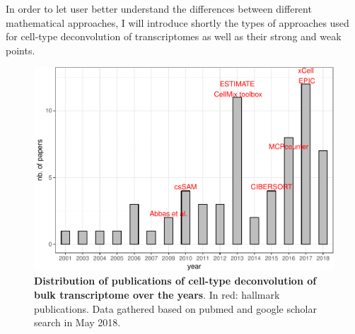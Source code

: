 \documentclass[12pt,]{book}
\theoremstyle{definition}
\theoremstyle{definition}
\theoremstyle{definition}
\theoremstyle{remark}
\begin{document}
In order to let user better understand the differences between different
mathematical approaches, I will introduce shortly the types of
approaches used for cell-type deconvolution of transcriptomes as well as
their strong and weak points.

\begin{figure}

{\centering \includegraphics[width=0.7\linewidth]{UCzPhDThesis_files/figure-latex/pubyear-1} 

}

\caption[Distribution of publications of cell-type deconvolution of bulk transcriptome over the years]{\textbf{Distribution of publications of cell-type
deconvolution of bulk transcriptome over the years}. In red: hallmark
publications. Data gathered based on pubmed and google scholar search in
May 2018.}\label{fig:pubyear}
\end{figure}
\end{document}
